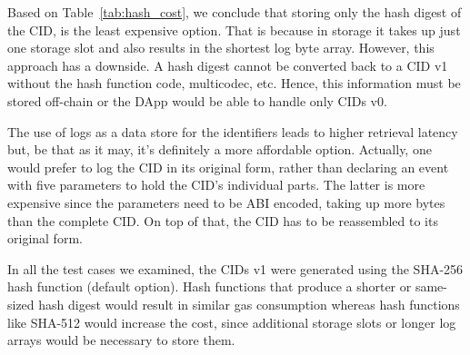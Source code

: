 Based on Table~\ref{tab:hash_cost}, we conclude that storing only the hash digest of the CID, is the least expensive option. That is because in storage it takes up just one storage slot and also results in the shortest log byte array. However, this approach has a downside. A hash digest cannot be converted back to a CID v1 without the hash function code, multicodec, etc. Hence, this information must be stored off-chain or the DApp would be able to handle only CIDs v0.

\begin{table}[htbp]
\centering
\caption{Cost of storing data identifiers (gas)}
\label{tab:hash_cost}
\end{table}

The use of logs as a data store for the identifiers leads to higher retrieval latency but, be that as it may, it’s definitely a more affordable option. Actually, one would prefer to log the CID in its original form, rather than declaring an event with five parameters to hold the CID’s individual parts. The latter is more expensive since the parameters need to be ABI encoded, taking up more bytes than the complete CID. On top of that, the CID has to be reassembled to its original form.

In all the test cases we examined, the CIDs v1 were generated using the SHA-256 hash function (default option). Hash functions that produce a shorter or same-sized hash digest would result in similar gas consumption whereas hash functions like SHA-512 would increase the cost, since additional storage slots or longer log arrays would be necessary to store them.

